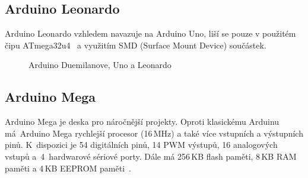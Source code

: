 		\subsection{Arduino Leonardo} 
		Arduino Leonardo vzhledem navazuje na Arduino Uno, liší se pouze v použitém čipu ATmega32u4~\cite{ArduinoLeonardo} a využitím SMD (Surface Mount Device) součástek.


\begin{figure}[!ht]
    \centering
			\hspace*{5mm}
			\hspace*{5mm}
    \caption{Arduino Duemilanove, Uno a Leonardo}
		\vspace{-10pt}	
\end{figure}


\newpage
	
					\subsection{Arduino Mega} 
					Arduino Mega je deska pro náročnější projekty. Oproti klasickému Arduinu má~Arduino Mega rychlejší procesor (16\,MHz) a také více vstupních a výstupních pinů. K~dispozici je 54 digitálních pinů, 14 PWM výstupů, 16 analogových vstupů a~4~hardwarové sériové porty. Dále má 256\,KB flash paměti, 8\,KB RAM paměti a 4\,KB EEPROM paměti~\cite{ArduinoMega}.	
			
